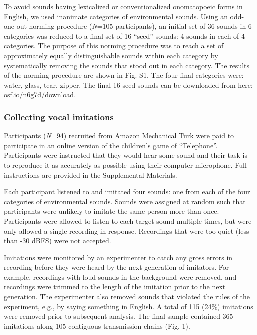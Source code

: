 \documentclass[english,floatsintext,man]{apa6}
\theoremstyle{definition}
\theoremstyle{definition}
\theoremstyle{remark}
\begin{document}
To avoid sounds having lexicalized or conventionalized onomatopoeic
forms in English, we used inanimate categories of environmental sounds.
Using an odd-one-out norming procedure (\emph{N}=105 participants), an
initial set of 36 sounds in 6 categories was reduced to a final set of
16 \enquote{seed} sounds: 4 sounds in each of 4 categories. The purpose
of this norming procedure was to reach a set of approximately equally
distinguishable sounds within each category by systematically removing
the sounds that stood out in each category. The results of the norming
procedure are shown in Fig. S1. The four final categories were: water,
glass, tear, zipper. The final 16 seed sounds can be downloaded from
here: \href{https://osf.io/n6g7d/download}{osf.io/n6g7d/download}.

\subsubsection{Collecting vocal
imitations}\label{collecting-vocal-imitations}

Participants (\emph{N}=94) recruited from Amazon Mechanical Turk were
paid to participate in an online version of the children's game of
\enquote{Telephone}. Participants were instructed that they would hear
some sound and their task is to reproduce it as accurately as possible
using their computer microphone. Full instructions are provided in the
Supplemental Materials.

Each participant listened to and imitated four sounds: one from each of
the four categories of environmental sounds. Sounds were assigned at
random such that participants were unlikely to imitate the same person
more than once. Participants were allowed to listen to each target sound
multiple times, but were only allowed a single recording in response.
Recordings that were too quiet (less than -30 dBFS) were not accepted.

Imitations were monitored by an experimenter to catch any gross errors
in recording before they were heard by the next generation of imitators.
For example, recordings with loud sounds in the background were removed,
and recordings were trimmed to the length of the imitation prior to the
next generation. The experimenter also removed sounds that violated the
rules of the experiment, e.g., by saying something in English. A total
of 115 (24\%) imitations were removed prior to subsequent analysis. The
final sample contained 365 imitations along 105 contiguous transmission
chains (Fig. 1).
\end{document}
